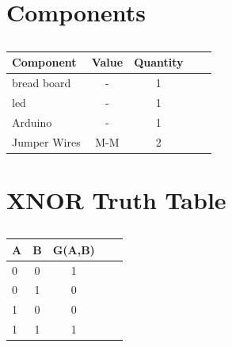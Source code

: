 \documentclass[10pt, a4paper]{article}
\title{\mytitle}
\author{\myauthor\hspace{1em}\\\contact\\IITH\hspace{0.5em}-\hspace{0.5em}\mymodule}
\date{}
\begin{document}
 \maketitle

 \begin{abstract}
  We can able to design all other gates using the pair Universal gates i.e;(NAND and NOR).This document is to understand the behavior and demonstrate the Implementation of XNOR Gate using NOR gate.
 \end{abstract}
    
\section{Components}
\begin{table}[htbp]
 \begin{center}
    \begin{tabular}{|l|c|c|c|c|} \hline
  \textbf{Component}& \textbf{Value} & \textbf{Quantity} \\
 \hline
 bread board& - & 1 \\ \hline
led &  - & 1 \\ \hline
Arduino & - & 1 \\ \hline
Jumper Wires & M-M & 2  \\ \hline
\end{tabular}  
\end{center}
\caption{\label{table:dummytable} }
\end{table}



\section{XNOR Truth Table}
\begin{table}[htbp]
 \begin{center}
    \begin{tabular}{|l|c|c|c|c|} \hline
  \textbf{A}& \textbf{B} & \textbf{G(A,B)} \\
 \hline
 0&0&1\\ \hline
0&1&0 \\ \hline
1&0&0\\ \hline
1&1&1\\ \hline
\end{tabular}  
\end{center}
\caption{\label{table:dummytable} }
\end{table}
\end{document}
